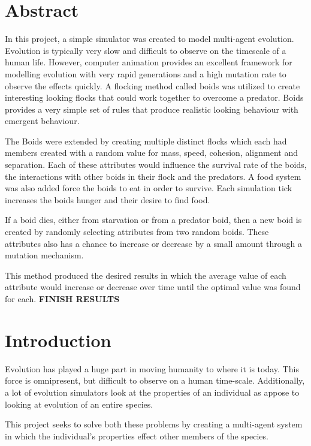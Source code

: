 \documentclass{egpubl}
\begin{document}
\section{Abstract}
In this project, a simple simulator was created to model multi-agent evolution. Evolution is typically very slow and difficult to observe on the timescale of a human life. However, computer animation provides an excellent framework for modelling evolution with very rapid generations and a high mutation rate to observe the effects quickly. A flocking method called boids was utilized to create interesting looking flocks that could work together to overcome a predator. Boids provides a very simple set of rules that produce realistic looking behaviour with emergent behaviour.
\par
The Boids were extended by creating multiple distinct flocks which each had members created with a random value for mass, speed, cohesion, alignment and separation. Each of these attributes would influence the survival rate of the boids, the interactions with other boids in their flock and the predators. A food system was also added force the boids to eat in order to survive. Each simulation tick increases the boids hunger and their desire to find food.
\par
If a boid dies, either from starvation or from a predator boid, then a new boid is created by randomly selecting attributes from two random boids. These attributes also has a chance to increase or decrease by a small amount through a mutation mechanism.
\par
This method produced the desired results in which the average value of each attribute would increase or decrease over time until the optimal value was found for each. \textbf{FINISH RESULTS} 
\section{Introduction}
Evolution has played a huge part in moving humanity to where it is today. This force is omnipresent, but difficult to observe on a human time-scale. Additionally, a lot of evolution simulators look at the properties of an individual as appose to looking at evolution of an entire species.
\par
This project seeks to solve both these problems by creating a multi-agent system in which the individual's properties effect other members of the species.
\end{document}
